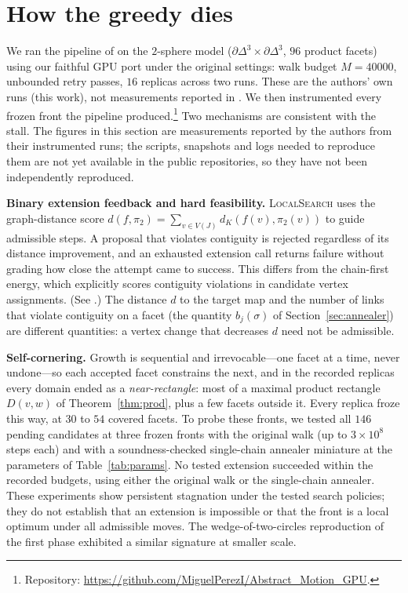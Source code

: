 \documentclass[12pt]{article}
\begin{document}
\section{How the greedy dies}\label{sec:fail}

We ran the pipeline of \cite{OLGB21} on the $2$-sphere model
($\partial\Delta^3\times\partial\Delta^3$, $96$ product facets) using
our faithful GPU port under the original settings: walk budget
$M=40000$, unbounded retry passes, $16$ replicas across two
runs.  These are the authors' own runs (this work), not measurements
reported in \cite{OLGB21}.  We then instrumented every frozen front the
pipeline produced.\footnote{Repository:
\url{https://github.com/MiguelPerezI/Abstract_Motion_GPU}.}
Two mechanisms are consistent with the stall.
The figures in this section are measurements reported by the authors
from their instrumented runs; the scripts, snapshots and logs needed to
reproduce them are not yet available in the public repositories, so
they have not been independently reproduced.

\textbf{Binary extension feedback and hard feasibility.}
\textsc{LocalSearch} uses the graph-distance score
$d(f,\pi_2)=\sum_{v\in V(J)}d_K(f(v),\pi_2(v))$
to guide admissible steps. A proposal that violates contiguity is rejected
regardless of its distance improvement, and an exhausted extension call
returns failure without grading how close the attempt came to success.
This differs from the chain-first energy, which explicitly scores
contiguity violations in candidate vertex assignments.
(See \cite[\S4.1, Algorithm~1]{OLGB21}.)  The distance $d$ to the
target map and the number of links that violate contiguity on a facet
(the quantity $b_j(\sigma)$ of Section~\ref{sec:annealer}) are different
quantities: a vertex change that decreases $d$ need not be admissible.

\textbf{Self-cornering.}  Growth is sequential and irrevocable---one
facet at a time, never undone---so each accepted facet constrains the
next, and in the recorded replicas every domain ended as a \emph{near-rectangle}: most of a
maximal product rectangle $D(v,w)$ of Theorem~\ref{thm:prod}, plus a
few facets outside it.  Every replica froze this way, at $30$ to $54$
covered facets.  To probe these fronts, we tested all
$146$ pending candidates at three frozen fronts with the original walk
(up to $3\times10^{8}$ steps each) and with a soundness-checked
single-chain annealer miniature at the parameters of
Table~\ref{tab:params}.
No tested extension succeeded within the recorded budgets, using either
the original walk or the single-chain annealer. These experiments show
persistent stagnation under the tested search policies; they do not
establish that an extension is impossible or that the front is a local
optimum under all admissible moves.  The wedge-of-two-circles
reproduction of the first phase exhibited a similar signature at
smaller scale.
\end{document}
